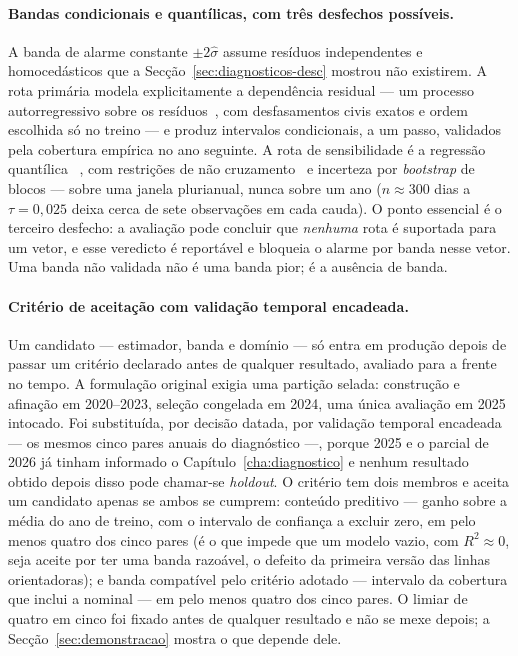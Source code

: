 \paragraph{Bandas condicionais e quantílicas, com três desfechos possíveis.} A banda de alarme
constante $\pm 2\hat\sigma$ assume resíduos independentes e homocedásticos que
a Secção~\ref{sec:diagnosticos-desc} mostrou não existirem. A rota primária
modela explicitamente a dependência residual --- um processo autorregressivo
sobre os resíduos~\cite{BoxJenkins2015}, com desfasamentos civis exatos e
ordem escolhida só no treino  --- e produz intervalos condicionais, a um passo, validados pela
cobertura empírica no ano seguinte. A rota de sensibilidade é a regressão
quantílica~\cite{KoenkerBassett1978} ,
com restrições de não cruzamento~\cite{Chernozhukov2010} e incerteza por \emph{bootstrap}
de blocos --- sobre uma janela plurianual, nunca sobre um ano ($n \approx
300$ dias a $\tau = 0{,}025$ deixa cerca de sete observações em cada cauda).
O ponto essencial é o terceiro desfecho: a avaliação pode concluir que
\emph{nenhuma} rota é suportada para um vetor, e esse veredicto é
reportável e bloqueia o alarme por banda nesse vetor. Uma banda não
validada não é uma banda pior; é a ausência de banda.

\paragraph{Critério de aceitação com validação temporal encadeada.} Um
candidato --- estimador, banda e domínio --- só entra em produção depois de
passar um critério declarado antes de qualquer resultado, avaliado para a
frente no tempo. A formulação original exigia uma partição selada: construção
e afinação em 2020--2023, seleção congelada em 2024, uma única avaliação em
2025 intocado. Foi substituída, por decisão datada, por validação temporal
encadeada --- os mesmos cinco pares anuais do diagnóstico ---, porque 2025 e
o parcial de 2026 já tinham informado o Capítulo~\ref{cha:diagnostico} e
nenhum resultado obtido depois disso pode chamar-se \emph{holdout}. O critério
tem dois membros e aceita um candidato apenas se ambos se cumprem: conteúdo
preditivo --- ganho sobre a média do ano de treino, com o intervalo de
confiança a excluir zero, em pelo menos quatro dos cinco pares
 (é o que
impede que um modelo vazio, com $R^2 \approx 0$, seja aceite por ter uma
banda razoável, o defeito da primeira versão das linhas orientadoras); e
banda compatível pelo critério adotado --- intervalo da cobertura que
inclui a nominal --- em pelo menos quatro dos cinco pares. O limiar de
quatro em cinco foi fixado antes de qualquer resultado e não se mexe depois;
a Secção~\ref{sec:demonstracao} mostra o que depende dele.

